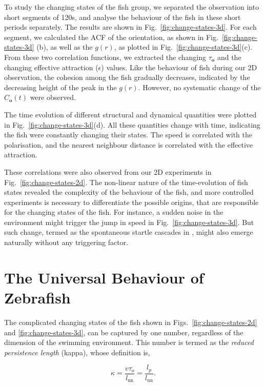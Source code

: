 \documentclass[11pt,twoside]{report}
\begin{document}
To study the changing states of the fish group, we separated the observation into short segments of 120s, and analyse the behaviour of the fish in these short periods separately. The results are shown in Fig.~\ref{fig:change-states-3d}. 
For each segment, we calculated the ACF of the orientation, as shown in Fig.~\ref{fig:change-states-3d} (b), as well as the $g(r)$, as plotted in Fig.~\ref{fig:change-states-3d}(c). From these two correlation functions, we extracted the changing $\tau_\mathbf{o}$ and the changing effective attraction ($\epsilon$) values. Like the behaviour of fish during our 2D observation, the cohesion among the fish gradually decreases, indicated by the decreasing height of the peak in the $g(r)$. However, no systematic change of the $C_\mathbf{o}(t)$ were observed.

The time evolution of different structural and dynamical quantities were plotted in Fig.~\ref{fig:change-states-3d}(d). All these quantities change with time, indicating the fish were constantly changing their states.
The speed is correlated with the polarisation, and the nearest neighbour distance is correlated with the effective attraction.


These correlations were also observed from our 2D experiments in Fig.~\ref{fig:change-states-2d}. The non-linear nature of the time-evolution of fish states revealed the complexity of the behaviour of the fish, and more controlled experiments is necessary to differentiate the possible origins, that are responsible for the changing states of the fish. For instance, a sudden noise in the environment might trigger the jump in speed in Fig.~\ref{fig:change-states-3d}. But such change, termed as the spontaneous startle cascades in \cite{rosenthal2015}, might also emerge naturally without any triggering factor.





\section{The Universal Behaviour of Zebrafish}
\label{section:universal}


The complicated changing states of the fish shown in Figs.~\ref{fig:change-states-2d} and \ref{fig:change-states-3d}, can be captured by one number, regardless of the dimension of the swimming environment. This number is termed as the \emph{reduced persistence length} (\gls{kappa}), whose definition is,

\begin{equation}
	\kappa 
	= \frac{v \tau_\mathrm{o}}{l_\mathrm{nn}}
	= \frac{l_p}{l_\mathrm{nn}}	.
\label{eq:kappa}
\end{equation}
\end{document}
